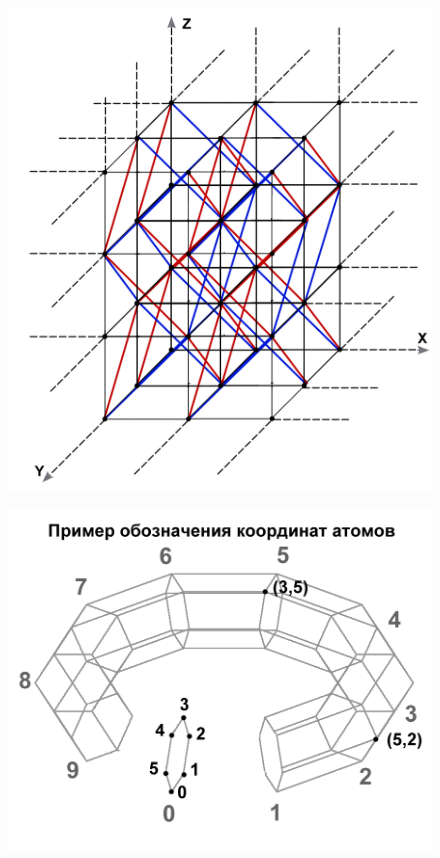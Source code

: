 \documentclass[12pt, a4paper]{article}
\begin{document}
\begin{figure}[htp]
\centering
\includegraphics[scale=9.0]{ZELEM.png}
\caption{}
\label{}
\end{figure}

\begin{figure}[htp]
	\centering
	\includegraphics[scale=0.35]{Tor_NUM.png}
	\caption{}
	\label{}
\end{figure}
\end{document}
